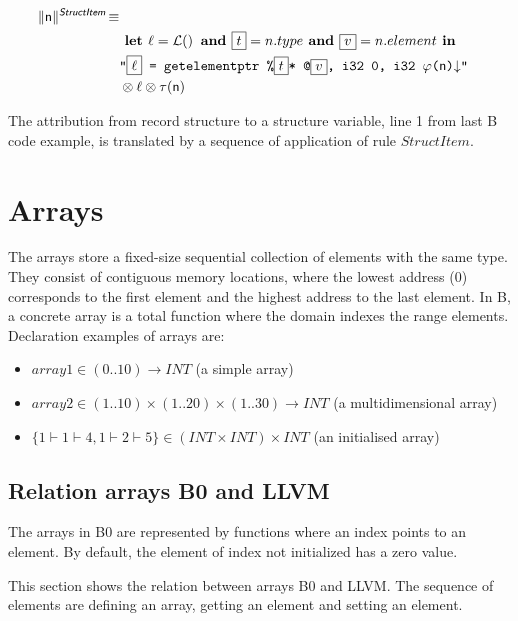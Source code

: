 \documentclass[10pt,a4paper]{article}
\newcommand{\trad}[2]{\ensuremath{\lVert \textsf{#1} \rVert^{\textit{#2}}}}
\newcommand{\nl}[0]{\ensuremath{\downarrow}}
\DeclareMathOperator{\isdef}{\equiv}
\DeclareMathOperator{\lbl}{\mathcal{L}()}
\newcommand{\llvm}[1]{\texttt{#1}}
\newcommand{\B}[1]{\textsf{#1}}
\newcommand{\LET}[0]{\textbf{ let }}
\newcommand{\IN}[0]{\textbf{ in }}
\newcommand{\AND}[0]{\textbf{ and }}
\newcommand{\PH}[1]{\framebox{$#1$}}
\newcommand{\sep}[0]{\otimes}
\newcommand{\SBPos}[0]{\ensuremath{\sf\varphi}}
\newcommand{\SBType}[0]{\ensuremath{\sf\tau}}
\begin{document}
\begin{align*}
\begin{split}
  \trad{n}{\B{StructItem}} \isdef \\
   & \LET \ell = \lbl  \AND  \PH{t} = n.type \AND \PH{v} = n.element \IN\\
   & \llvm{"\PH{\ell} = getelementptr \%\PH{t}* @\PH{v}, i32 0, i32  \SBPos(\B{n})\nl"} \\
   & \sep  \ell  \sep \SBType(\B{n})\\
\end{split}
\end{align*}

The attribution from record structure to a structure variable, line 1 from last 
B code example, is translated by a sequence of application of rule $StructItem$.


\section{Arrays}

The arrays store a fixed-size sequential collection of elements with the same type. 
They consist of contiguous memory locations, where the lowest address (0) 
corresponds to the first element and the highest address to the last element.
In B, a concrete array is a total function where the domain indexes the range 
elements. Declaration examples of arrays are:
\begin{itemize}
	\item $array1 \in (0..10) \to INT $	(a simple array)
	\item $array2 \in (1..10) \times (1..20) \times (1..30) \to INT $   (a multidimensional array)
	\item $\{1\vdash1\vdash4, 1\vdash2\vdash5\}  \in (INT \times INT) \times INT$ (an initialised array)
\end{itemize} 


\subsection{Relation arrays B0 and LLVM}

The arrays in B0 are represented by functions where an index points to an 
element. By default, the element of index not initialized has a zero value. 

This section shows the relation between arrays B0 and LLVM. The sequence of
elements are defining an array, getting an element and setting an
element.
\end{document}

